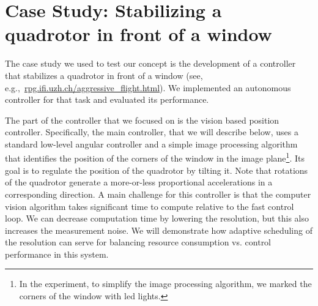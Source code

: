 \documentclass{sig-alternate-ipsn13}
\begin{document}
\section{Case Study: Stabilizing a quadrotor in front of a window}
\label{sec:caseStady}

The case study we used to test our concept is the development of a controller that stabilizes a quadrotor in front of a window (see, e.g.,~\url{rpg.ifi.uzh.ch/aggressive_flight.html}).
We implemented an autonomous controller for that task and evaluated its performance.

The part of the controller that we focused on is the vision based position controller. Specifically, the main controller, that we will describe below, uses a standard low-level angular controller and a simple image processing algorithm that identifies the position of the corners of the window in the image plane\footnote{In the experiment, to simplify the image processing algorithm, we marked the corners of the window with led lights.}. Its goal is to regulate the position of the quadrotor by tilting it. Note that rotations of the quadrotor generate a more-or-less proportional accelerations in a corresponding direction. A main challenge for this controller is that the computer vision algorithm takes significant time to compute relative to the fast control loop. We can decrease computation time by lowering the resolution, but this also increases the measurement noise. We will demonstrate how adaptive scheduling of the resolution can serve for balancing resource consumption vs. control performance in this system.
\end{document}
